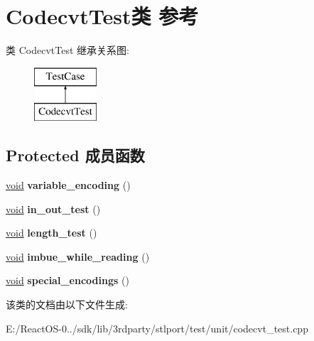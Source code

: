 \hypertarget{class_codecvt_test}{}\section{Codecvt\+Test类 参考}
\label{class_codecvt_test}
类 Codecvt\+Test 继承关系图\+:\begin{figure}[H]
\begin{center}
\leavevmode
\includegraphics[height=2.000000cm]{class_codecvt_test}
\end{center}
\end{figure}
\subsection*{Protected 成员函数}
\begin{DoxyCompactItemize}
\item 
\mbox{\label{class_codecvt_test_a2b5aa6e56815294f9fb105e672279703}} 
\hyperlink{interfacevoid}{void} {\bfseries variable\+\_\+encoding} ()
\item 
\mbox{\label{class_codecvt_test_aba4d33bcb75338756bac70eae319007f}} 
\hyperlink{interfacevoid}{void} {\bfseries in\+\_\+out\+\_\+test} ()
\item 
\mbox{\label{class_codecvt_test_a7c543d094d28a22230b063ca75ee3c80}} 
\hyperlink{interfacevoid}{void} {\bfseries length\+\_\+test} ()
\item 
\mbox{\label{class_codecvt_test_a0772c605fd950169c69c8ef17d928523}} 
\hyperlink{interfacevoid}{void} {\bfseries imbue\+\_\+while\+\_\+reading} ()
\item 
\mbox{\label{class_codecvt_test_af41c5c98cab687127dc2b46540149960}} 
\hyperlink{interfacevoid}{void} {\bfseries special\+\_\+encodings} ()
\end{DoxyCompactItemize}


该类的文档由以下文件生成\+:\begin{DoxyCompactItemize}
\item 
E\+:/\+React\+O\+S-\/0../sdk/lib/3rdparty/stlport/test/unit/codecvt\+\_\+test.\+cpp\end{DoxyCompactItemize}
